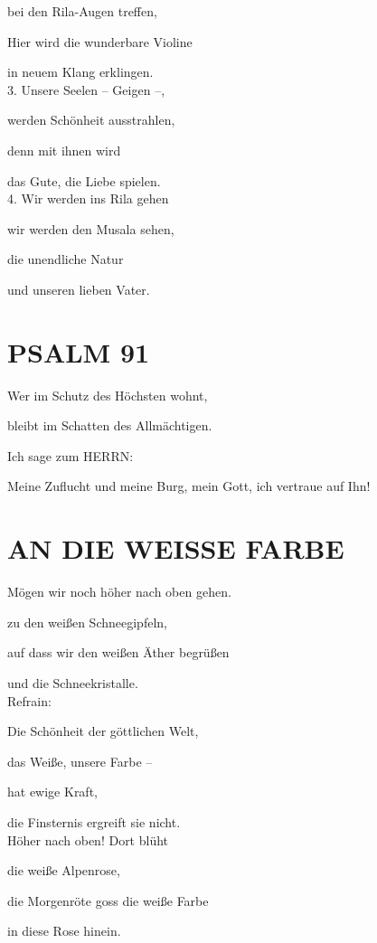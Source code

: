 \documentclass[11pt,a5paper,twoside]{article}
\begin{document}
bei den Rila-Augen treffen, 
 
Hier wird die wunderbare Violine 

in neuem Klang erklingen.\\

3. Unsere Seelen -- Geigen --,

werden Schönheit ausstrahlen,

denn mit ihnen wird 

das Gute, die Liebe spielen.\\

4. Wir werden ins Rila gehen 

wir werden den Musala sehen,

die unendliche Natur

und unseren lieben Vater.

\section[Psalm 91]{PSALM 91}

Wer im Schutz des Höchsten wohnt, 
 
bleibt im Schatten des Allmächtigen.
 
Ich sage zum HERRN:
 
Meine Zuflucht und meine Burg, mein Gott, ich vertraue auf Ihn! 

\section[An die weiße Farbe]{AN DIE WEISSE FARBE}

Mögen wir noch höher nach oben gehen.

zu den weißen Schneegipfeln,

auf dass wir den weißen Äther begrüßen

und die Schneekristalle.\\

Refrain:

Die Schönheit der göttlichen Welt,

das Weiße, unsere Farbe --

hat ewige Kraft,

die Finsternis ergreift sie nicht.\\

Höher nach oben! Dort blüht 

die weiße Alpenrose,

die Morgenröte goss die weiße Farbe

in diese Rose hinein. \\
\end{document}
